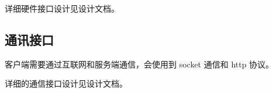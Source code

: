 详细硬件接口设计见设计文档。

\subsection{通讯接口}
% 
% 
% 

客户端需要通过互联网和服务端通信，会使用到 socket 通信和 http 协议。

详细的通信接口设计见设计文档。